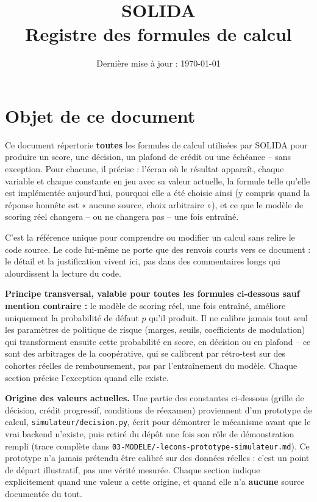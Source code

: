 \documentclass[11pt,a4paper]{article}
\title{\textcolor{solidateal}{\Huge SOLIDA} \\[0.3em] \Large Registre des formules de calcul}
\author{}
\date{Dernière mise à jour : \today}
\newcommand{\brk}{\allowbreak}
\begin{document}
\maketitle

\section*{Objet de ce document}

Ce document répertorie \textbf{toutes} les formules de calcul utilisées par SOLIDA pour produire
un score, une décision, un plafond de crédit ou une échéance -- sans exception. Pour chacune, il
précise : l'écran où le résultat apparaît, chaque variable et chaque constante en jeu avec sa
valeur actuelle, la formule telle qu'elle est implémentée aujourd'hui, pourquoi elle a été
choisie ainsi (y compris quand la réponse honnête est « aucune source, choix arbitraire »), et ce
que le modèle de scoring réel changera -- ou ne changera pas -- une fois entraîné.

C'est la référence unique pour comprendre ou modifier un calcul sans relire le code source. Le
code lui-même ne porte que des renvois courts vers ce document : le détail et la justification
vivent ici, pas dans des commentaires longs qui alourdissent la lecture du code.

\textbf{Principe transversal, valable pour toutes les formules ci-dessous sauf mention contraire :}
le modèle de scoring réel, une fois entraîné, améliore uniquement la probabilité de défaut $p$
qu'il produit. Il ne calibre jamais tout seul les paramètres de politique de risque (marges,
seuils, coefficients de modulation) qui transforment ensuite cette probabilité en score, en
décision ou en plafond -- ce sont des arbitrages de la coopérative, qui se calibrent par
rétro-test sur des cohortes réelles de remboursement, pas par l'entraînement du modèle. Chaque
section précise l'exception quand elle existe.

\textbf{Origine des valeurs actuelles.} Une partie des constantes ci-dessous (grille de décision,
crédit progressif, conditions de réexamen) proviennent d'un prototype de calcul,
\texttt{simulateur/\brk decision.py}, écrit pour démontrer le mécanisme avant que le vrai backend
n'existe, puis retiré du dépôt une fois son rôle de démonstration rempli (trace complète dans
\texttt{03-MODELE/\brk 09-lecons-prototype-simulateur.md}). Ce prototype n'a jamais prétendu être
calibré sur des données réelles : c'est un point de départ illustratif, pas une vérité mesurée.
Chaque section indique explicitement quand une valeur a cette origine, et quand elle n'a
\textbf{aucune} source documentée du tout.
\end{document}
